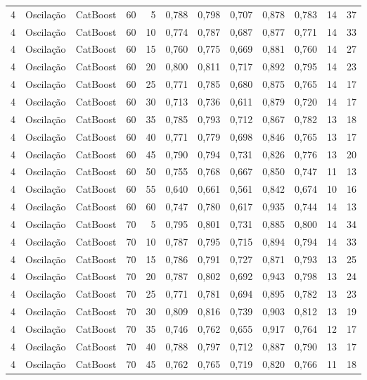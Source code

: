 \begin{longtable}{@{}rllrrrrrrrrr@{}}
4 & Oscilação & CatBoost & 60 & 5 & 0,788 & 0,798 & 0,707 & 0,878 & 0,783 & 14 & 37 \\
4 & Oscilação & CatBoost & 60 & 10 & 0,774 & 0,787 & 0,687 & 0,877 & 0,771 & 14 & 33 \\
4 & Oscilação & CatBoost & 60 & 15 & 0,760 & 0,775 & 0,669 & 0,881 & 0,760 & 14 & 27 \\
4 & Oscilação & CatBoost & 60 & 20 & 0,800 & 0,811 & 0,717 & 0,892 & 0,795 & 14 & 23 \\
4 & Oscilação & CatBoost & 60 & 25 & 0,771 & 0,785 & 0,680 & 0,875 & 0,765 & 14 & 17 \\
4 & Oscilação & CatBoost & 60 & 30 & 0,713 & 0,736 & 0,611 & 0,879 & 0,720 & 14 & 17 \\
4 & Oscilação & CatBoost & 60 & 35 & 0,785 & 0,793 & 0,712 & 0,867 & 0,782 & 13 & 18 \\
4 & Oscilação & CatBoost & 60 & 40 & 0,771 & 0,779 & 0,698 & 0,846 & 0,765 & 13 & 17 \\
4 & Oscilação & CatBoost & 60 & 45 & 0,790 & 0,794 & 0,731 & 0,826 & 0,776 & 13 & 20 \\
4 & Oscilação & CatBoost & 60 & 50 & 0,755 & 0,768 & 0,667 & 0,850 & 0,747 & 11 & 13 \\
4 & Oscilação & CatBoost & 60 & 55 & 0,640 & 0,661 & 0,561 & 0,842 & 0,674 & 10 & 16 \\
4 & Oscilação & CatBoost & 60 & 60 & 0,747 & 0,780 & 0,617 & 0,935 & 0,744 & 14 & 13 \\
4 & Oscilação & CatBoost & 70 & 5 & 0,795 & 0,801 & 0,731 & 0,885 & 0,800 & 14 & 34 \\
4 & Oscilação & CatBoost & 70 & 10 & 0,787 & 0,795 & 0,715 & 0,894 & 0,794 & 14 & 33 \\
4 & Oscilação & CatBoost & 70 & 15 & 0,786 & 0,791 & 0,727 & 0,871 & 0,793 & 13 & 25 \\
4 & Oscilação & CatBoost & 70 & 20 & 0,787 & 0,802 & 0,692 & 0,943 & 0,798 & 13 & 24 \\
4 & Oscilação & CatBoost & 70 & 25 & 0,771 & 0,781 & 0,694 & 0,895 & 0,782 & 13 & 23 \\
4 & Oscilação & CatBoost & 70 & 30 & 0,809 & 0,816 & 0,739 & 0,903 & 0,812 & 13 & 19 \\
4 & Oscilação & CatBoost & 70 & 35 & 0,746 & 0,762 & 0,655 & 0,917 & 0,764 & 12 & 17 \\
4 & Oscilação & CatBoost & 70 & 40 & 0,788 & 0,797 & 0,712 & 0,887 & 0,790 & 13 & 17 \\
4 & Oscilação & CatBoost & 70 & 45 & 0,762 & 0,765 & 0,719 & 0,820 & 0,766 & 11 & 18 \\

\end{longtable}
